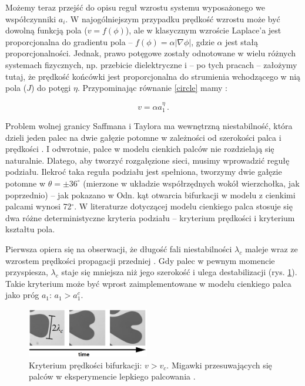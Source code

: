 \documentclass[]{pracamgr}
\begin{document}
      Możemy teraz przejść do opisu reguł wzrostu systemu wyposażonego we współczynniki $a_i$. W najogólniejszym przypadku prędkość wzrostu może być dowolną funkcją pola ($v = f(\phi)$), ale w klasycznym wzroście Laplace'a jest proporcjonalna do gradientu pola -- $f(\phi) = \alpha |\nabla \phi|$, gdzie $\alpha$ jest stałą proporcjonalności. Jednak, prawo potęgowe zostały odnotowane w wielu różnych systemach fizycznych, np. przebicie dielektryczne \cite{niemeyer1984fractal} i -- po tych pracach -- założymy tutaj, że prędkość końcówki jest proporcjonalna do strumienia wchodzącego w nią pola ($J$) do potęgi $\eta$. Przypominając równanie \eqref{circle} mamy \cite{carleson2002laplacian, selander1999two}:
      
      \begin{equation}\label{velocity}
        v = \alpha a_1^\eta \,.
      \end{equation}
      
      Problem wolnej granicy Saffmana i Taylora ma wewnętrzną niestabilność, która dzieli jeden palec na dwie gałęzie potomne w zależności od szerokości palca i prędkości \cite{lajeunesse2000tip}. I odwrotnie, palce w modelu cienkich palców nie rozdzielają się naturalnie. Dlatego, aby tworzyć rozgałęzione sieci, musimy wprowadzić regułę podziału. Ilekroć taka reguła podziału jest spełniona, tworzymy dwie gałęzie potomne w $\theta = \pm 36^\circ$ (mierzone w układzie współrzędnych wokół wierzchołka, jak poprzednio) -- jak pokazano w Odn. \cite{hastings2001growth, carleson2002laplacian, gubiec2008fingered, devauchelle2012ramification} kąt otwarcia bifurkacji w modelu z cienkimi palcami wynosi 72$^\circ$. W literaturze dotyczącej modelu cienkiego palca stosuje się dwa różne deterministyczne kryteria podziału -- kryterium prędkości i kryterium kształtu pola.

      Pierwsza opiera się na obserwacji, że długość fali niestabilności $\lambda_c$ maleje wraz ze wzrostem prędkości propagacji przedniej \cite{pecelerowicz2016stabilizing}. Gdy palec w pewnym momencie przyspiesza, $\lambda_c$ staje się mniejsza niż jego szerokość i ulega destabilizacji (rys. \ref{wavelength}). Takie kryterium może być wprost zaimplementowane w modelu cienkiego palca jako próg $a_1$: $a_1 > a_1^c$.
      
      \begin{figure}[H]
        \centering
        \includegraphics[width=0.475\textwidth]{figs/wavelength.png}
        \vspace{-10pt}
        \caption{Kryterium prędkości bifurkacji: $v > v_{c}$. Migawki przesuwających się palców w eksperymencie lepkiego palcowania \cite{bischofberger2015island}.}
        \label{wavelength}
      \end{figure}
\end{document}
